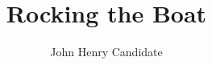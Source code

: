 \documentclass[12pt]{article}
\title{Rocking the Boat}
\author{John Henry Candidate}
\begin{document}
\maketitle



\endabstract
\end{document}
